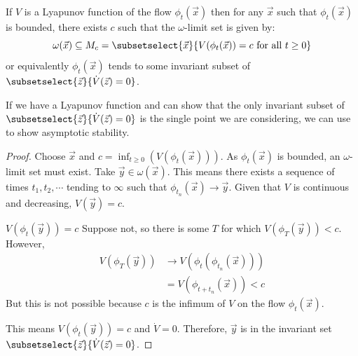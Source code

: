 \documentclass[../Main.tex]{subfiles}
\begin{document}
\begin{theorem}
    If $V$ is a Lyapunov function of the flow $\phi_t(\vec{x})$ then for any $\vec{x}$ such that $\phi_t(\vec{x})$ is bounded, there exists $c$ such that the $\omega$-limit set is given by:
    \begin{equation*}
        \omega(\vec{x}) \subseteq M_c = \subsetselect{\vec{x}}{V(\phi_t(\vec{x})) = c \text{ for all }t \geq 0}
    \end{equation*}
    or equivalently $\phi_t(\vec{x})$ tends to some invariant subset of $\subsetselect{\vec{z}}{\dot{V}(\vec{z}) = 0}$.
    \label{thmLaSalleInvariance}
\end{theorem}
\begin{remark}
    If we have a Lyapunov function and can show that the only invariant subset of $\subsetselect{\vec{z}}{\dot{V}(\vec{z}) = 0}$ is the single point we are considering, we can use  to show asymptotic stability.
\end{remark}
\begin{proof}
    Choose $\vec{x}$ and $c = \inf_{t \geq 0} \left(V(\phi_t(\vec{x}))\right)$. As $\phi_t(\vec{x})$ is bounded, an $\omega$-limit set must exist. Take $\vec{y} \in \omega(\vec{x})$. This means there exists a sequence of times $t_1, t_2, \cdots$ tending to $\infty$ such that $\phi_{t_n}(\vec{x}) \to \vec{y}$. Given that $V$ is continuous and decreasing, $V(\vec{y}) = c$.
    \begin{subproof}{$V(\phi_t(\vec{y})) = c$}
        Suppose not, so there is some $T$ for which $V(\phi_T(\vec{y})) < c$. However,
        \begin{align*}
            V(\phi_T(\vec{y})) &\to V(\phi_t(\phi_{t_n}(\vec{x}))) \\
            &= V(\phi_{t + t_n}(\vec{x})) < c
        \end{align*}
        But this is not possible because $c$ is the infimum of $V$ on the flow $\phi_t(\vec{x})$. \contradiction
    \end{subproof}
    This means $V(\phi_t(\vec{y})) = c$ and $\dot{V} = 0$. Therefore, $\vec{y}$ is in the invariant set $\subsetselect{\vec{z}}{\dot{V}(\vec{z}) = 0}$.
\end{proof}
\end{document}
